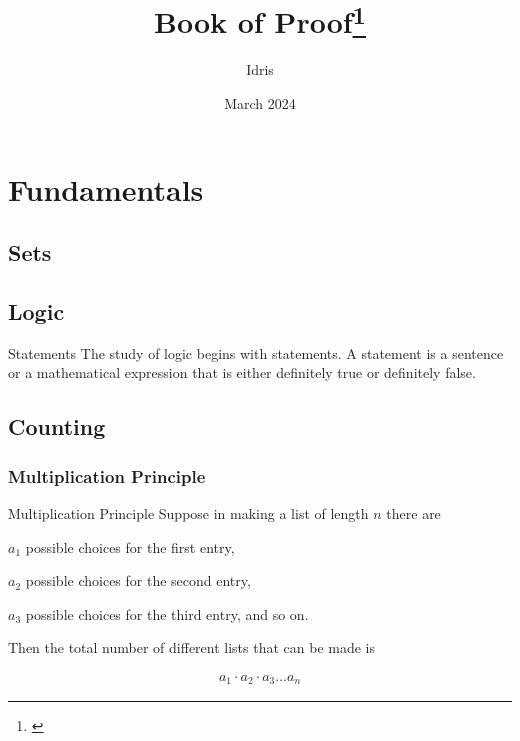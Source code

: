\documentclass[openany, 12pt]{book}
\title{Book of Proof\footnote{\cite{hammackBookProof2018}}}
\author{Idris}
\date{March 2024}
\begin{document}
\maketitle{}
\tableofcontents
{}

\part{Fundamentals}
\chapter{Sets}

\setcounter{chapter}{1}
\chapter{Logic}
\begin{definition}{Statements}{}
	The study of logic begins with statements. A statement is a sentence or a
	mathematical expression that is either definitely true or definitely false.
\end{definition}

\chapter{Counting}
\setcounter{section}{1}

\section{Multiplication Principle}
\begin{definition}{Multiplication Principle}{}
	Suppose in making a list of length $n$ there are
	\begin{alist}
		\item $a_1$ possible choices for the first entry,
		\item $a_2$ possible choices for the second entry,
		\item $a_3$ possible choices for the third entry, and so on.
		\item Then the total number of different lists that can be made is
	\end{alist}
	\begin{align*}
		a_1 \cdot a_2 \cdot a_3 \ldots a_n
	\end{align*}
\end{definition}
\end{document}
